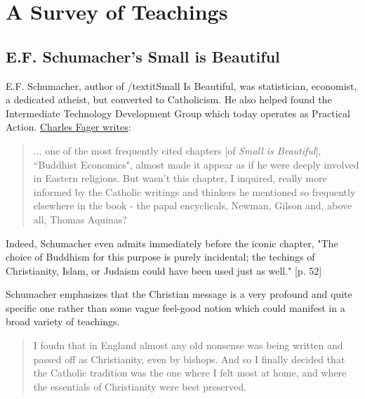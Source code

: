 \documentclass[10pt,letterpaper,openany]{book}
\begin{document}
\section{A Survey of Teachings}

\subsection{E.F. Schumacher's Small is Beautiful}

E.F. Schumacher, author of /textit{Small Is Beautiful}, was statistician, economist, a dedicated atheist, but converted to Catholicism. He also helped found the Intermediate Technology Development Group which today operates as Practical Action. \href{https://www.religion-online.org/article/small-is-beautiful-and-so-is-rome-surprising-faith-of-e-f-schumacher/}{Charles Fager writes}:

\begin{quote}
... one of the most frequently cited chapters [of \textit{Small is Beautiful}], ``Buddhist Economics", almost made it appear as if he were deeply involved in Eastern religions. But wasn't this chapter, I inquired, really more informed by the Catholic writings and thinkers he mentioned so frequently elsewhere in the book - the papal encyclicals, Newman, Gilson and, above all, Thomas Aquinas?
\end{quote}

Indeed, Schumacher even admits immediately before the iconic chapter, "The choice of Buddhism for this purpose is purely incidental; the techings of Christianity, Islam, or Judaism could have been used just as well." [p. 52]


Schumacher emphasizes that the Christian message is a very profound and quite specific one rather than some vague feel-good notion which could manifest in a broad variety of teachings.

\begin{quote}
I foudn that in England almost any old nonsense was being written and passed off as Christianity, even by bishops. And so I finally decided that the Catholic tradition was the one where I felt most at home, and where the essentials of Christianity were best preserved.
\end{quote}
\end{document}
